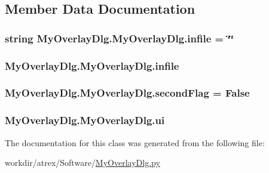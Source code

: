 \subsection{Member Data Documentation}
\hypertarget{class_my_overlay_dlg_1_1_my_overlay_dlg_a9a655828844f2260620132477ff6e2ac}{
\subsubsection[{infile}]{\setlength{\rightskip}{0pt plus 5cm}string My\-Overlay\-Dlg.\-My\-Overlay\-Dlg.\-infile = \char`\"{}\char`\"{}\hspace{0.3cm}{\ttfamily [static]}}}\label{class_my_overlay_dlg_1_1_my_overlay_dlg_a9a655828844f2260620132477ff6e2ac}
\hypertarget{class_my_overlay_dlg_1_1_my_overlay_dlg_acca8e0275695cf61524525634591381b}{
\subsubsection[{infile}]{\setlength{\rightskip}{0pt plus 5cm}My\-Overlay\-Dlg.\-My\-Overlay\-Dlg.\-infile}}\label{class_my_overlay_dlg_1_1_my_overlay_dlg_acca8e0275695cf61524525634591381b}
\hypertarget{class_my_overlay_dlg_1_1_my_overlay_dlg_a90f6e4408789fb09a8373122658e9dda}{
\subsubsection[{second\-Flag}]{\setlength{\rightskip}{0pt plus 5cm}My\-Overlay\-Dlg.\-My\-Overlay\-Dlg.\-second\-Flag = False\hspace{0.3cm}{\ttfamily [static]}}}\label{class_my_overlay_dlg_1_1_my_overlay_dlg_a90f6e4408789fb09a8373122658e9dda}
\hypertarget{class_my_overlay_dlg_1_1_my_overlay_dlg_a7d657b769e24e56ee48781d352de441e}{
\subsubsection[{ui}]{\setlength{\rightskip}{0pt plus 5cm}My\-Overlay\-Dlg.\-My\-Overlay\-Dlg.\-ui}}\label{class_my_overlay_dlg_1_1_my_overlay_dlg_a7d657b769e24e56ee48781d352de441e}


The documentation for this class was generated from the following file\-:\begin{DoxyCompactItemize}
\item 
workdir/atrex/\-Software/\hyperlink{_my_overlay_dlg_8py}{My\-Overlay\-Dlg.\-py}\end{DoxyCompactItemize}
